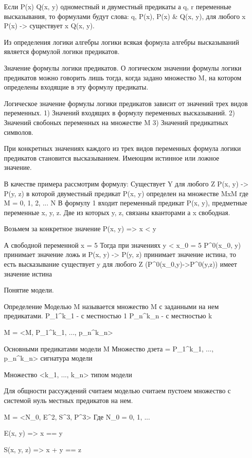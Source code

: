 Если P(x) Q(x, y) одноместный и двуместный предикаты а q, r переменные высказывания, то формулами будут слова:
q, P(x), P(x) & Q(x, y), для любого x P(x) -> существует x Q(x, y).

Из определения логики алгебры логики всякая формула алгебры высказываний является формулой логики предикатов.


Значение формулы логики предикатов.
О логическом значении формулы логики предикатов можно говорить лишь тогда, когда задано множество M, на котором определены входящие в эту формулу предикаты.

Логическое значение формулы логики предикатов зависит от значений трех видов переменных.
1) Значений входящих в формулу переменных высказываний.
2) Значений свобоных переменных на множестве M
3) Значений предикатных символов.

При конкретных значениях каждого из трех видов переменных формула логики предикатов становится высказыванием.
Имеющим истинное или ложное значение.

В качестве примера рассмотрим формулу:
Существует Y для любого Z P(x, y) -> P(y, z) в которой двуместный предикат P(x, y) определен на множестве MxM где M = { 0, 1, 2, ... N}
В формулу 1 входит переменный предикат P(x, y), предметные переменные x, y, z. Две из которых y, z, связаны кванторами а x свободная.

Возьмем за конкретное значение P(x, y) => x < y

А свободной переменной x = 5
Тогда при значениях y < x_0  = 5
P^0(x_0, y) принимает значение ложь и P(x, y) -> P(y, z) принимает значение истина, то есть высказывание существует y для любого Z
(P^0(x_0,y)->P^0(y,z)) имеет значение истина

Понятие модели.

Определение
Моделью M называется множество M с заданными на нем предикатами.
P_1^k_1 - с местностью 1
P_n^k_n - с местностью k

M = <M, P_1^k_1, ..., p_n^k_n>

Основными предикатами модели M
Множество дзета = P_1^k_1, ..., p_n^k_n> сигнатура модели

Множество <k_1, ..., k_n> типом модели

Для общности рассуждений считаем моделью считаем пустоем множество с системой нуль местных предикатов на нем.

M = <N_0, E^2, S^3, P^3>
Где N_0 = {0, 1, ...}

E(x, y) => x == y

S(x, y, z) => x + y == z

